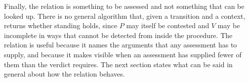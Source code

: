 Finally, the relation is something to be assessed and not something that can be looked up. There is no general algorithm that, given a transition and a context, returns whether standing holds, since $P$ may itself be contested and $V$ may be incomplete in ways that cannot be detected from inside the procedure. The relation is useful because it names the arguments that any assessment has to supply, and because it makes visible when an assessment has supplied fewer of them than the verdict requires. The next section states what can be said in general about how the relation behaves.

